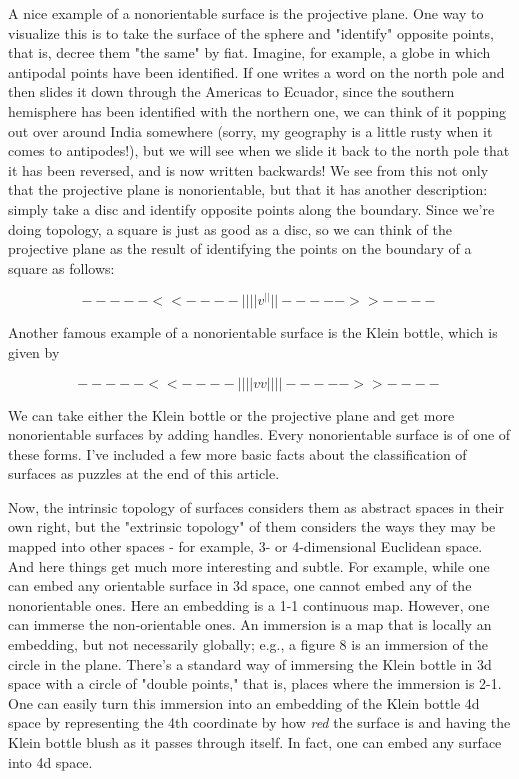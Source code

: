 A nice example of a nonorientable surface is the projective plane.  One
way to visualize this is to take the surface of the sphere and
"identify" opposite points, that is, decree them "the same" by fiat.
Imagine, for example, a globe in which antipodal points have been
identified.  If one writes a word on the north pole and then slides it
down through the Americas to Ecuador, since the southern hemisphere has
been identified with the northern one, we can think of it popping out
over around India somewhere (sorry, my geography is a little rusty when
it comes to antipodes!), but we will see when we slide it back to the
north pole that it has been reversed, and is now written backwards!  We
see from this not only that the projective plane is nonorientable, but
that it has another description: simply take a disc and identify
opposite points along the boundary.  Since we're doing topology, a
square is just as good as a disc, so we can think of the projective
plane as the result of identifying the points on the boundary of a
square as follows:



$$

     -----<<----
    |           |
    |           |  
    v           ^
    |           |
    |           |
     ----->>----

$$
    

Another famous example of a nonorientable surface is the Klein bottle,
which is given by



$$

     -----<<----
    |           |
    |           |
    v           v
    |           |
    |           |
     ----->>----

$$
    

We can take either the Klein bottle or the projective plane and get more
nonorientable surfaces by adding handles.  Every nonorientable surface
is of one of these forms.  I've included a few more basic facts about
the classification of surfaces as puzzles at the end of this article.

Now, the intrinsic topology of surfaces considers them as abstract
spaces in their own right, but the "extrinsic topology" of them
considers the ways they may be mapped into other spaces - for example,
3- or 4-dimensional Euclidean space.  And here things get much more
interesting and subtle.  For example, while one can embed any orientable
surface in 3d space, one cannot embed any of the nonorientable ones.
Here an embedding is a 1-1 continuous map.  However, one can immerse
the non-orientable ones.  An immersion is a map that is locally an
embedding, but not necessarily globally; e.g., a figure 8 is an
immersion of the circle in the plane.  There's a standard way of
immersing the Klein bottle in 3d space with a circle of "double points,"
that is, places where the immersion is 2-1.  One can easily turn this
immersion into an embedding of the Klein bottle 4d space by representing
the 4th coordinate by how \emph{red} the surface is and having the Klein
bottle blush as it passes through itself.  In fact, one can embed any
surface into 4d space.

